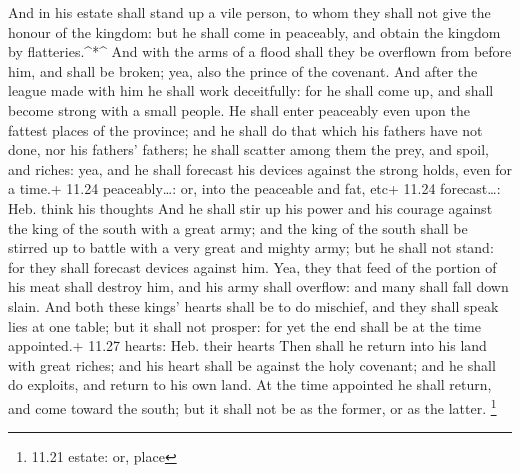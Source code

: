  And in his estate shall stand up a vile person, to whom
they shall not give the honour of the kingdom: but he shall come in
peaceably, and obtain the kingdom by flatteries.\^{}*\^{} 
And with the arms of a flood shall they be overflown from before him,
and shall be broken; yea, also the prince of the covenant. 
And after the league made with him he shall work deceitfully: for he
shall come up, and shall become strong with a small people.
 He shall enter peaceably even upon the fattest places of
the province; and he shall do that which his fathers have not done, nor
his fathers' fathers; he shall scatter among them the prey, and spoil,
and riches: yea, and he shall forecast his devices against the strong
holds, even for a time.+ 11.24 peaceably\ldots: or, into the peaceable
and fat, etc+ 11.24 forecast\ldots: Heb. think his thoughts
 And he shall stir up his power and his courage against the
king of the south with a great army; and the king of the south shall be
stirred up to battle with a very great and mighty army; but he shall not
stand: for they shall forecast devices against him.  Yea,
they that feed of the portion of his meat shall destroy him, and his
army shall overflow: and many shall fall down slain.  And
both these kings' hearts shall be to do mischief, and they shall speak
lies at one table; but it shall not prosper: for yet the end shall be at
the time appointed.+ 11.27 hearts: Heb. their hearts  Then
shall he return into his land with great riches; and his heart shall be
against the holy covenant; and he shall do exploits, and return to his
own land.  At the time appointed he shall return, and come
toward the south; but it shall not be as the former, or as the latter.
\footnote{11.21 estate: or, place}

